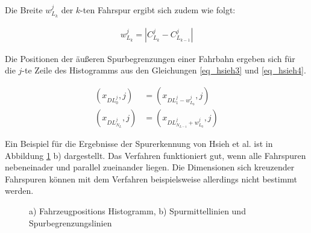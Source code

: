 Die Breite $w_{L_k}^{j}$ der $k$-ten Fahrspur ergibt sich zudem wie folgt:

\begin{ceqn}
\begin{align}
\label{eq_hsieh2}
    w_{L_k}^{j} = | C_{L_{k}}^{j} - C_{L_{k-1}}^{j} |
\end{align}
\end{ceqn}

Die Positionen der äußeren Spurbegrenzungen einer Fahrbahn ergeben sich für die $j$-te Zeile des Histogramms
aus den Gleichungen \ref{eq_hsieh3} und \ref{eq_hsieh4}.

\begin{ceqn}
\begin{align}
\label{eq_hsieh3}
    (x_{DL_0^j}, j) &= (x_{DL_1^j - w_{L_0}^j}, j) \\
\label{eq_hsieh4}
    (x_{DL_{N_L}^j}, j) &= (x_{DL_{N_{L-1}}^j + w_{L_0}^j}, j)
\end{align}
\end{ceqn}

Ein Beispiel für die Ergebnisse der Spurerkennung von Hsieh et al. ist in Abbildung \ref{fig:relw_hsieh_results} b) dargestellt.
Das Verfahren funktioniert gut, wenn alle Fahrspuren nebeneinader und parallel zueinander liegen. Die Dimensionen
sich kreuzender Fahrspuren können mit dem Verfahren beispielsweise allerdings nicht bestimmt werden.

\begin{figure}[H]
    \centering
    \caption[Ergebnisse Histogramm Erstellung und Spurextraktion (Hsieh et al.)]{a) Fahrzeugpositions Histogramm, b) Spurmittellinien und Spurbegrenzungslinien \cite[]{Hsieh2006}}
    \label{fig:relw_hsieh_results}
\end{figure}


